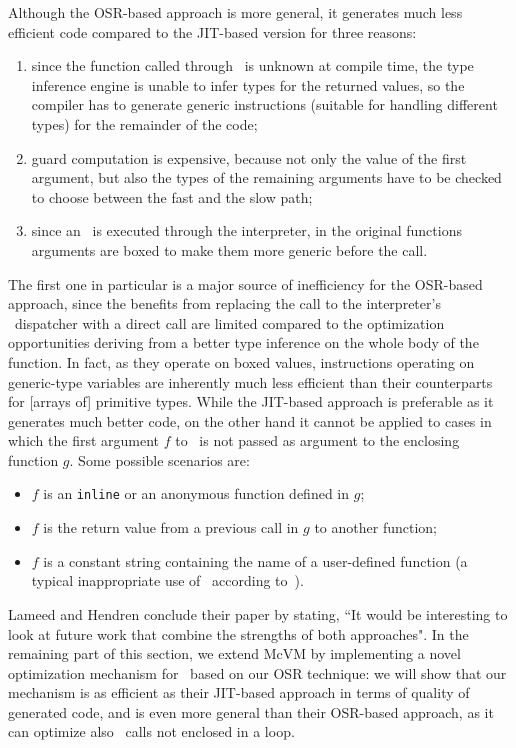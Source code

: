 Although the OSR-based approach is more general, it generates much less efficient code compared to the JIT-based version for three reasons:
\begin{enumerate}
\item since the function called through \feval\ is unknown at compile time, the type inference engine is unable to infer types for the returned values, so the compiler has to generate generic instructions (suitable for handling different types) for the remainder of the code;
\item guard computation is expensive, because not only the value of the first argument, but also the types of the remaining arguments have to be checked to choose between the fast and the slow path;
\item since an \feval\ is executed through the interpreter, in the original functions arguments are boxed to make them more generic before the call.
\end{enumerate}

The first one in particular is a major source of inefficiency for the OSR-based approach, since the benefits from replacing the call to the interpreter's \feval\ dispatcher with a direct call are limited compared to the optimization opportunities deriving from a better type inference on the whole body of the function. In fact, as they operate on boxed values, instructions operating on generic-type variables are inherently much less efficient than their counterparts for [arrays of] primitive types. While the JIT-based approach is preferable as it generates much better code, on the other hand it cannot be applied to cases in which the first argument $f$ to \feval\ is not passed as argument to the enclosing function $g$. Some possible scenarios are:
\begin{itemize}
\item $f$ is an {\tt inline} or an anonymous function defined in $g$;
\item $f$ is the return value from a previous call in $g$ to another function;
\item $f$ is a constant string containing the name of a user-defined function (a typical inappropriate use of \feval\ according to~\cite{radpour2013refactoring}).
\end{itemize}
 
Lameed and Hendren conclude their paper by stating, ``It would be interesting to look at future work that combine the
strengths of both approaches". In the remaining part of this section, we extend McVM by implementing a novel optimization mechanism for \feval\ based on our OSR technique: we will show that our mechanism is as efficient as their JIT-based approach in terms of quality of generated code, and is even more general than their OSR-based approach, as it can optimize also \feval\ calls not enclosed in a loop.

